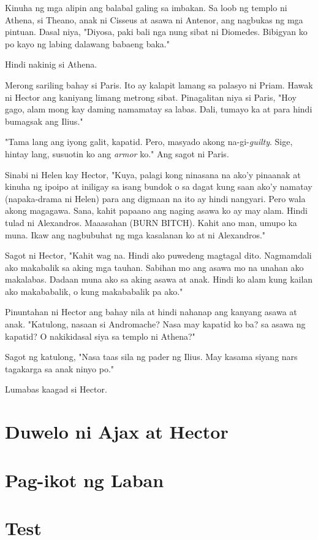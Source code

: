 \documentclass[12pt,letterpaper]{report}
\begin{document}
Kinuha ng mga alipin ang balabal galing sa imbakan. Sa loob ng templo ni Athena, si Theano, anak ni Cisseus at asawa ni Antenor, ang nagbukas ng mga pintuan. Dasal niya, "Diyosa, paki bali nga nung sibat ni Diomedes. Bibigyan ko po kayo ng labing dalawang babaeng baka."

Hindi nakinig si Athena.

Merong sariling bahay si Paris. Ito ay kalapit lamang sa palasyo ni Priam. Hawak ni Hector ang kaniyang limang metrong sibat. Pinagalitan niya si Paris, "Hoy gago, alam mong kay daming namamatay sa labas. Dali, tumayo ka at para hindi bumagsak ang Ilius."

"Tama lang ang iyong galit, kapatid. Pero, masyado akong na-gi-\textit{guilty}. Sige, hintay lang, susuotin ko ang \textit{armor} ko." Ang sagot ni Paris.

Sinabi ni Helen kay Hector, "Kuya, palagi kong ninasana na ako'y pinaanak at kinuha ng ipoipo at iniligay sa isang bundok o sa dagat kung saan ako'y namatay (napaka-drama ni Helen) para ang digmaan na ito ay hindi nangyari. Pero wala akong magagawa. Sana, kahit papaano ang naging asawa ko ay may alam. Hindi tulad ni Alexandros. Maaasahan (BURN BITCH). Kahit ano man, umupo ka muna. Ikaw ang nagbubuhat ng mga kasalanan ko at ni Alexandros."

Sagot ni Hector, "Kahit wag na. Hindi ako puwedeng magtagal dito. Nagmamdali ako makabalik sa aking mga tauhan. Sabihan mo ang asawa mo na unahan ako makalabas. Dadaan muna ako sa aking asawa at anak. Hindi ko alam kung kailan ako makababalik, o kung makababalik pa ako."

Pinuntahan ni Hector ang bahay nila at hindi nahanap ang kanyang asawa at anak. "Katulong, nasaan si Andromache? Nasa may kapatid ko ba? sa asawa ng kapatid? O nakikidasal siya sa templo ni Athena?"

Sagot ng katulong, "Nasa taas sila ng pader ng Ilius. May kasama siyang nars tagakarga sa anak ninyo po."

Lumabas kaagad si Hector.

\pagebreak
\chapter{Duwelo ni Ajax at Hector}
\pagebreak
\chapter{Pag-ikot ng Laban}
\pagebreak
\chapter{Test}
\end{document}

